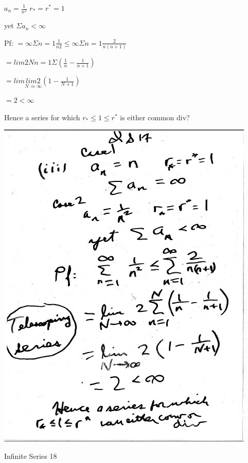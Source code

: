 \documentclass[10pt,a4paper]{article}
\begin{document}
{{\begin{center}
$a_{n} = \frac{1}{n^{2}}$ $r_{*} = r^{*} = 1$

yet $\Sigma a_{n} < \infty$

Pf: $= \infty \Sigma n=1 \frac{1}{n{2}} \leq \infty \Sigma n=1 \frac{2}{n(n+1)}$

\end{center}

$=lim 2 N n=1 \Sigma ({\frac{1}{n}}-{\frac{1}{n+1}})$

$=lim {\underset{\text{$N\Rightarrow \infty$}}{lim 2}}(1-\frac{1}{N+1})$

$=2<\infty$

Hence a series for which $r_{*}\leq 1\leq r^{*}$ is either common div?
\begin{center}

\includegraphics[scale=.7]{Pages/IS_17}

\end{center}

\newpage %

\begin{center}

Infinite Series 18


\end{center}}}
\end{document}
